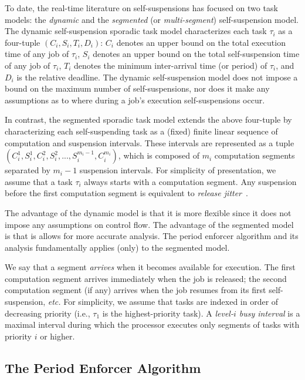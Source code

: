 To date, the real-time literature on self-suspensions has focused on two task models: the \emph{dynamic} and the \emph{segmented} (or \emph{multi-segment}) self-suspension model. 
The dynamic self-suspension sporadic task model characterizes each
task $\tau_i$ as a four-tuple $(C_i,S_i,T_i,D_i)$: 
$C_i$ denotes an upper bound on the total execution time of any job of $\tau_i$,
$S_i$ denotes an upper bound on the total self-suspension time of any job of $\tau_i$,
$T_i$ denotes the minimum inter-arrival time (or period) of $\tau_i$, and $D_i$ is the relative deadline. The dynamic self-suspension model does not impose a bound on the maximum number of self-suspensions, nor does it make any assumptions as to where during a job's execution self-suspensions occur.

In contrast, the segmented sporadic task model extends the above four-tuple by characterizing each self-suspending task as a (fixed) finite linear sequence of computation and suspension intervals. These intervals are represented as a tuple
$(C_{i}^1,S_{i}^1,C_{i}^2,S_{i}^2,...,S_{i}^{m_i-1},C_{i}^{m_i})$, which is composed of $m_i$ computation segments separated by $m_i-1$ suspension intervals. For simplicity of presentation, we assume that a task $\tau_i$ always starts with a computation segment. Any suspension before the first computation segment is equivalent to \emph{release jitter}~\cite{ABRTW:93}.

The advantage of the dynamic model is that it is more flexible since it does not impose any assumptions on control flow. The advantage of the segmented model is that is allows for more accurate analysis. The period enforcer algorithm and its analysis fundamentally applies (only) to the segmented model.

We say that a segment \emph{arrives} when it becomes available for execution. The first computation segment arrives immediately when the job is released; the second computation segment (if any) arrives when the job resumes from its first self-suspension, \textit{etc.} For simplicity, we assume that tasks are indexed in order of decreasing priority (i.e., $\tau_1$ is the highest-priority task). A \emph{level-$i$ busy interval} is a maximal interval during which  the processor executes only segments of tasks with priority $i$ or higher.


\subsection{The Period Enforcer Algorithm}
\label{sec:pe}

